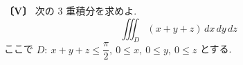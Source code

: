 \noindent\textbf{〔V〕}
次の 3 重積分を求めよ.
\[
\iiint_D (x+y+z)\,dx\,dy\,dz
\]
ここで $D:\ x+y+z\le \dfrac{\pi}{2},\ 0\le x,\ 0\le y,\ 0\le z$ とする.
